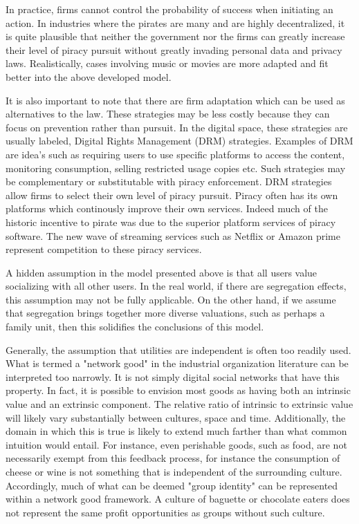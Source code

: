 In practice, firms cannot control the probability of success when initiating an action. In industries where the pirates are many and are highly decentralized, it is quite plausible that neither the government nor the firms can greatly increase their level of piracy pursuit without greatly invading personal data and privacy laws. Realistically, cases involving music or movies are more adapted and fit better into the above developed model. 

It is also important to note that there are firm adaptation which can be used as alternatives to the law. These strategies may be less costly because they can focus on prevention rather than pursuit. In the digital space, these strategies are usually labeled, Digital Rights Management (DRM) strategies. Examples of DRM are idea's such as requiring users to use specific platforms to access the content, monitoring consumption, selling restricted usage copies etc. Such strategies may be complementary or substitutable with piracy enforcement. DRM strategies allow firms to select their own level of piracy pursuit. Piracy often has its own platforms which continously improve their own services. Indeed much of the historic incentive to pirate was due to the superior platform services of piracy software. The new wave of streaming services such as Netflix or Amazon prime represent competition to these piracy services.


A hidden assumption in the model presented above is that all users value socializing with all other users. In the real world, if there are segregation effects, this assumption may not be fully applicable. On the other hand, if we assume that segregation brings together more diverse valuations, such as perhaps a family unit, then this solidifies the conclusions of this model.

Generally, the assumption that utilities are independent is often too readily used. What is termed a "network good" in the industrial organization literature can be interpreted too narrowly. It is not simply digital social networks that have this property. In fact, it is possible to envision most goods as having both an intrinsic value and an extrinsic component. The relative ratio of intrinsic to extrinsic value will likely vary substantially between cultures, space and time. Additionally, the domain in which this is true is likely to extend much farther than what common intuition would entail. For instance, even perishable goods, such as food, are not necessarily exempt from this feedback process, for instance the consumption of cheese or wine is not something that is independent of the surrounding culture. Accordingly, much of what can be deemed "group identity" can be represented within a network good framework. A culture of baguette or chocolate eaters does not represent the same profit opportunities as groups without such culture.

